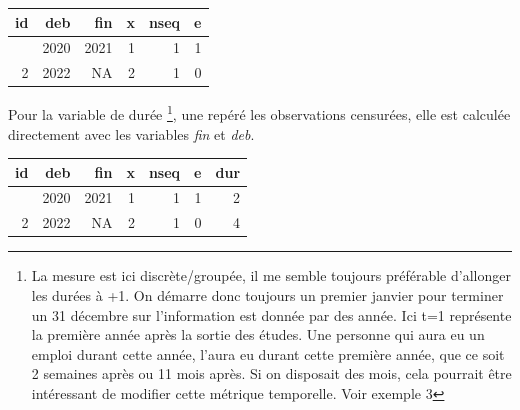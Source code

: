 \documentclass[
  12pt,
  letterpaper,
  DIV=11,
  numbers=noendperiod,
  onepage,
  openany]{scrreprt}
\newenvironment{Shaded}{\begin{snugshade}}{\end{snugshade}}
\newcommand{\DecValTok}[1]{\textcolor[rgb]{0.86,0.86,0.80}{#1}}
\newcommand{\FunctionTok}[1]{\textcolor[rgb]{0.94,0.94,0.56}{#1}}
\newcommand{\NormalTok}[1]{\textcolor[rgb]{0.80,0.80,0.80}{#1}}
\newcommand{\OtherTok}[1]{\textcolor[rgb]{0.94,0.94,0.56}{#1}}
\newcommand{\SpecialCharTok}[1]{\textcolor[rgb]{0.86,0.64,0.64}{#1}}
\begin{document}
\begin{Shaded}
\end{Shaded}

\begin{longtable}[]{@{}rrrrrr@{}}
\toprule\noalign{}
id & deb & fin & x & nseq & e \\
\midrule\noalign{}
\endhead
\bottomrule\noalign{}
\endlastfoot
1 & 2020 & 2021 & 1 & 1 & 1 \\
2 & 2022 & NA & 2 & 1 & 0 \\
\end{longtable}

Pour la variable de durée \footnote{La mesure est ici discrète/groupée,
  il me semble toujours préférable d'allonger les durées à +1. On
  démarre donc toujours un premier janvier pour terminer un 31 décembre
  sur l'information est donnée par des année. Ici t=1 représente la
  première année après la sortie des études. Une personne qui aura eu un
  emploi durant cette année, l'aura eu durant cette première année, que
  ce soit 2 semaines après ou 11 mois après. Si on disposait des mois,
  cela pourrait être intéressant de modifier cette métrique temporelle.
  Voir exemple 3}, une repéré les observations censurées, elle est
calculée directement avec les variables \emph{fin} et \emph{deb}.

\begin{Shaded}
\end{Shaded}

\begin{longtable}[]{@{}rrrrrrr@{}}
\toprule\noalign{}
id & deb & fin & x & nseq & e & dur \\
\midrule\noalign{}
\endhead
\bottomrule\noalign{}
\endlastfoot
1 & 2020 & 2021 & 1 & 1 & 1 & 2 \\
2 & 2022 & NA & 2 & 1 & 0 & 4 \\
\end{longtable}
\end{document}
